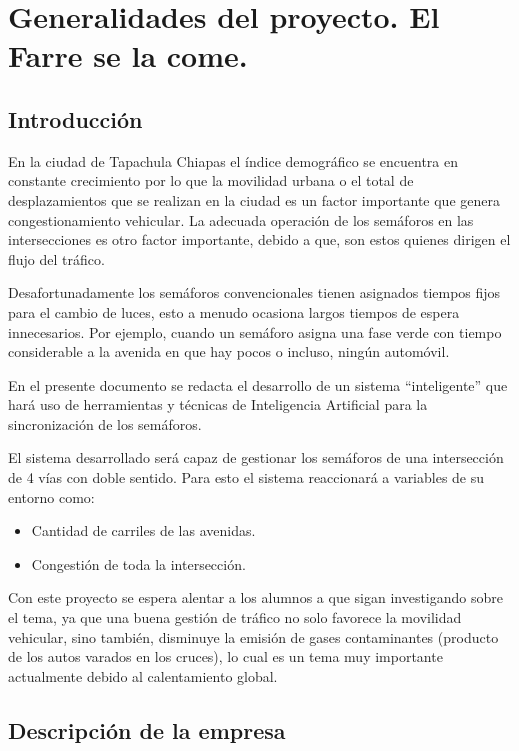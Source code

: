 \chapter{Generalidades del proyecto. El Farre se la come.}

\section{Introducción}

En la ciudad de Tapachula Chiapas el índice demográfico se encuentra en constante crecimiento por lo que la movilidad urbana o el total de desplazamientos que se realizan en la ciudad es un factor importante que genera congestionamiento vehicular. La adecuada operación de los semáforos en las intersecciones es otro factor importante, debido a que, son estos quienes dirigen el flujo del tráfico.

Desafortunadamente los semáforos convencionales tienen asignados tiempos fijos para el cambio de luces, esto a menudo ocasiona largos tiempos de espera innecesarios. Por ejemplo, cuando un semáforo asigna una fase verde con tiempo considerable a la avenida en que hay pocos o incluso, ningún automóvil.

En el presente documento se redacta el desarrollo de un sistema “inteligente” que hará uso de herramientas y técnicas de Inteligencia Artificial para la sincronización de los semáforos.

El sistema desarrollado será capaz de gestionar los semáforos de una intersección de 4 vías con doble sentido. Para esto el sistema reaccionará a variables de su entorno como:

{\setlength{\baselineskip}{0.7\baselineskip}
\begin{itemize}
	\item Cantidad de carriles de las avenidas.
	\item Congestión de toda la intersección.
\end{itemize}}

Con este proyecto se espera alentar a los alumnos a que sigan investigando sobre el tema, ya que una buena gestión de tráfico no solo favorece la movilidad vehicular, sino también, disminuye la emisión de gases contaminantes (producto de los autos varados en los cruces), lo cual es un tema muy importante actualmente debido al calentamiento global.

\section{Descripción de la empresa}

